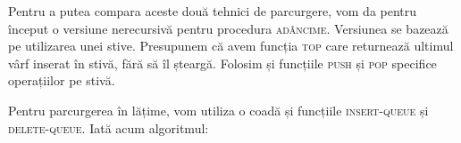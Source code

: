 \documentclass[9pt,a4paper]{report}
\begin{document}
Pentru a putea compara aceste două tehnici de parcurgere, vom da pentru început o versiune nerecursivă pentru procedura \textsc{adâncime}. Versiunea se bazează pe utilizarea unei stive. Presupunem că avem funcția \textsc{top} care returnează ultimul vârf inserat în stivă, fără să îl șteargă. Folosim și funcțiile \textsc{push} și \textsc{pop} specifice operațiilor pe stivă.

\pagebreak

\begin{algorithm}
    \begin{algorithmic}
                \EndWhile
            \EndWhile
        \EndProcedure
    \end{algorithmic}
\end{algorithm}

Pentru parcurgerea în lățime, vom utiliza o coadă și funcțiile \textsc{insert-queue} și \textsc{delete-queue}. Iată acum algoritmul:

\begin{algorithm}
    \begin{algorithmic}
                    \EndIf
            \EndFor
            \EndWhile
        \EndProcedure
            \EndFor
                \EndIf
            \EndFor
        \EndProcedure
    \end{algorithmic}
\end{algorithm}
\end{document}
